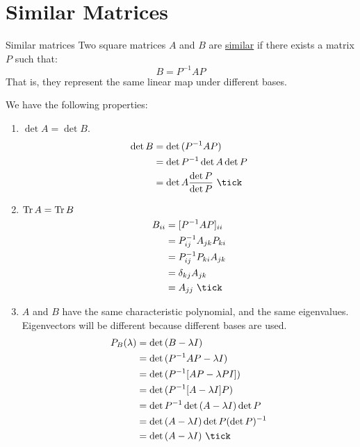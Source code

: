 \documentclass[../Main.tex]{subfiles}
\begin{document}
\section{Similar Matrices}
\begin{definition}{Similar matrices}
    Two square matrices $A$ and $B$ are \underline{similar} if there exists a matrix $P$ such that:
    \begin{equation*}
        B = P^{-1} A P
    \end{equation*}
    That is, they represent the same linear map under different bases.
\end{definition}
We have the following properties:
\begin{enumerate}
    \item $\det{A} = \det{B}$.
        \begin{align*}
            \det{B} &= \det{(P^{-1} A P)} \\
            &= \det{P^{-1}} \det{A} \det{P} \\
            &= \det{A} \frac{\det{P}}{\det{P}}~\tick
        \end{align*}
    \item $\operatorname{Tr}{A} = \operatorname{Tr}{B}$
        \begin{align*}
            B_{ii} &= [P^{-1}AP]_{ii} \\
            &= P_{ij}^{-1} A_{jk} P_{ki} \\
            &= P_{ij}^{-1} P_{ki} A_{jk} \\
            &= \delta_{kj} A_{jk} \\
            &= A_{jj}~\tick
        \end{align*}
    \item $A$ and $B$ have the same characteristic polynomial, and the same eigenvalues. Eigenvectors will be different because different bases are used.
        \begin{align*}
            P_B(\lambda) &= \det{(B - \lambda I)} \\
            &= \det{(P^{-1} A P - \lambda I)} \\
            &= \det{(P^{-1}[AP - \lambda PI])} \\
            &= \det{(P^{-1}[A - \lambda I]P)} \\
            &= \det{P^{-1}} \det{(A - \lambda I)} \det{P} \\
            &= \det{(A - \lambda I)} \det{P} (\det{P})^{-1} \\
            &= \det{(A - \lambda I)}~\tick
        \end{align*}
\end{enumerate}
\end{document}
